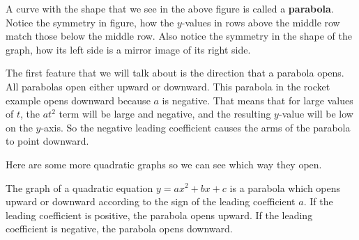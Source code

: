 \documentclass{ximera}
\begin{document}
 A curve with the shape that we see in the above figure
      is called a \textbf{parabola}.
      Notice the symmetry in figure,
      how the $y$-values in rows above the middle row match those below the middle row.
      Also notice the symmetry in the shape of the graph,
      how its left side is a mirror image of its right side.

 The first feature that we will talk about is the
      direction that a parabola opens.
      All parabolas open either upward or downward.
      This parabola in the rocket example opens downward because $a$ is negative.
      That means that for large values of $t$, the $at^2$ term will be large and negative,
      and the resulting $y$-value will be low on the $y$-axis.
      So the negative leading coefficient causes the arms of the parabola to point downward.
    

 Here are some more quadratic graphs so we can see which way they open.
\begin{image}
\end{image}
\begin{image}
\end{image}
\begin{image}
\end{image}
  The graph of a quadratic equation $y=ax^2+bx+c$ is a parabola which opens upward or downward
        according to the sign of the leading coefficient $a$.
        If the leading coefficient is positive,
        the parabola opens upward.
        If the leading coefficient is negative,
        the parabola opens downward.
\end{document}
